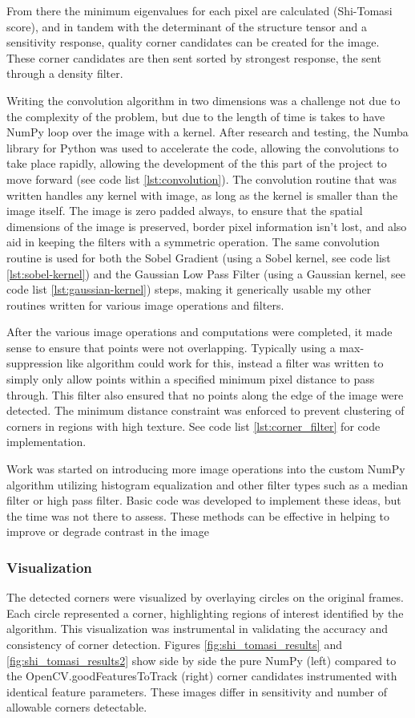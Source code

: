 \documentclass[11pt, conference, letterpaper]{IEEEtran}
\begin{document}
From there the minimum eigenvalues for each pixel are calculated (Shi-Tomasi score), and in tandem with the determinant of the structure tensor and a sensitivity response, quality corner candidates can be created for the image. These corner candidates are then sent sorted by strongest response, the sent through a density filter.

Writing the convolution algorithm in two dimensions was a challenge not due to the complexity of the problem, but due to the length of time is takes to have NumPy loop over the image with a kernel. After research and testing, the Numba library for Python was used to accelerate the code, allowing the convolutions to take place rapidly, allowing the development of the this part of the project to move forward (see code list \ref{lst:convolution}). The convolution routine that was written handles any kernel with image, as long as the kernel is smaller than the image itself. The image is zero padded always, to ensure that the spatial dimensions of the image is preserved, border pixel information isn't lost, and also aid in keeping the filters with a symmetric operation. The same convolution routine is used for both the Sobel Gradient (using a Sobel kernel, see code list \ref{lst:sobel-kernel}) and the Gaussian Low Pass Filter (using a Gaussian kernel, see code list \ref{lst:gaussian-kernel}) steps, making it generically usable my other routines written for various image operations and filters.

After the various image operations and computations were completed, it made sense to ensure that points were not overlapping. Typically using a max-suppression like algorithm could work for this, instead a filter was written to simply only allow points within a specified minimum pixel distance to pass through. This filter also ensured that no points along the edge of the image were detected. The minimum distance constraint was enforced to prevent clustering of corners in regions with high texture. See code list \ref{lst:corner_filter} for code implementation.

Work was started on introducing more image operations into the custom NumPy algorithm utilizing histogram equalization and other filter types such as a median filter or high pass filter. Basic code was developed to implement these ideas, but the time was not there to assess. These methods can be effective in helping to improve or degrade contrast in the image
\bigskip

\subsubsection{Visualization}
The detected corners were visualized by overlaying circles on the original frames. Each circle represented a corner, highlighting regions of interest identified by the algorithm. This visualization was instrumental in validating the accuracy and consistency of corner detection. Figures \ref{fig:shi_tomasi_results} and \ref{fig:shi_tomasi_results2} show side by side the pure NumPy (left) compared to the OpenCV.goodFeaturesToTrack (right) corner candidates instrumented with identical feature parameters. These images differ in sensitivity and number of allowable corners detectable.
\end{document}
